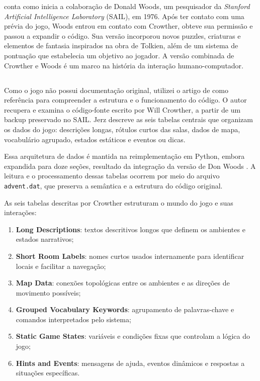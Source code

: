 \documentclass[12pt,a4paper]{article}
\begin{document}
\textcite{levy2010hackers} conta como inicia a colaboração de Donald Woods, um pesquisador da \textit{Stanford Artificial Intelligence Laboratory} (SAIL), em 1976. Após ter contato com uma prévia do jogo, Woods entrou em contato com Crowther, obteve sua permissão e passou a expandir o código. Sua versão incorporou novos puzzles, criaturas e elementos de fantasia inspirados na obra de Tolkien, além de um sistema de pontuação que estabelecia um objetivo ao jogador. A versão combinada de Crowther e Woods é um marco na história da interação humano-computador.

\subsection{}
Como o jogo não possui documentação original, utilizei o artigo de \textcite{jerz2007colossal} como referência para compreender a estrutura e o funcionamento do código. O autor recupera e examina o código-fonte escrito por Will Crowther, a partir de um backup preservado no SAIL. Jerz descreve as seis tabelas centrais que organizam os dados do jogo: descrições longas, rótulos curtos das salas, dados de mapa, vocabulário agrupado, estados estáticos e eventos ou dicas.  

Essa arquitetura de dados é mantida na reimplementação em Python, embora expandida para doze seções, resultado da integração da versão de Don Woods \textcite{rhodes_adventure_py}. A leitura e o processamento dessas tabelas ocorrem por meio do arquivo \texttt{advent.dat}, que preserva a semântica e a estrutura do código original. 

As seis tabelas descritas por Crowther estruturam o mundo do jogo e suas interações:
\begin{enumerate}
    \item \textbf{Long Descriptions}: textos descritivos longos que definem os ambientes e estados narrativos;
    \item \textbf{Short Room Labels}: nomes curtos usados internamente para identificar locais e facilitar a navegação;
    \item \textbf{Map Data}: conexões topológicas entre os ambientes e as direções de movimento possíveis;
    \item \textbf{Grouped Vocabulary Keywords}: agrupamento de palavras-chave e comandos interpretados pelo sistema;
    \item \textbf{Static Game States}: variáveis e condições fixas que controlam a lógica do jogo;
    \item \textbf{Hints and Events}: mensagens de ajuda, eventos dinâmicos e respostas a situações específicas.
\end{enumerate}
\end{document}
